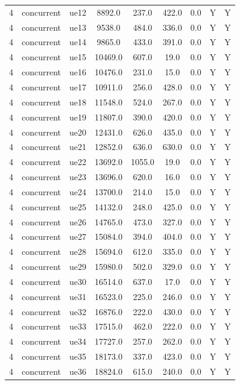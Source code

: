 \begin{table}[ht]
\begin{tabular}{|c|c|c|c|c|c|c|c|c|}
4 & concurrent & ue12 & 8892.0 & 237.0 & 422.0 & 0.0 & Y & Y \\
4 & concurrent & ue13 & 9538.0 & 484.0 & 336.0 & 0.0 & Y & Y \\
4 & concurrent & ue14 & 9865.0 & 433.0 & 391.0 & 0.0 & Y & Y \\
4 & concurrent & ue15 & 10469.0 & 607.0 & 19.0 & 0.0 & Y & Y \\
4 & concurrent & ue16 & 10476.0 & 231.0 & 15.0 & 0.0 & Y & Y \\
4 & concurrent & ue17 & 10911.0 & 256.0 & 428.0 & 0.0 & Y & Y \\
4 & concurrent & ue18 & 11548.0 & 524.0 & 267.0 & 0.0 & Y & Y \\
4 & concurrent & ue19 & 11807.0 & 390.0 & 420.0 & 0.0 & Y & Y \\
4 & concurrent & ue20 & 12431.0 & 626.0 & 435.0 & 0.0 & Y & Y \\
4 & concurrent & ue21 & 12852.0 & 636.0 & 630.0 & 0.0 & Y & Y \\
4 & concurrent & ue22 & 13692.0 & 1055.0 & 19.0 & 0.0 & Y & Y \\
4 & concurrent & ue23 & 13696.0 & 620.0 & 16.0 & 0.0 & Y & Y \\
4 & concurrent & ue24 & 13700.0 & 214.0 & 15.0 & 0.0 & Y & Y \\
4 & concurrent & ue25 & 14132.0 & 248.0 & 425.0 & 0.0 & Y & Y \\
4 & concurrent & ue26 & 14765.0 & 473.0 & 327.0 & 0.0 & Y & Y \\
4 & concurrent & ue27 & 15084.0 & 394.0 & 404.0 & 0.0 & Y & Y \\
4 & concurrent & ue28 & 15694.0 & 612.0 & 335.0 & 0.0 & Y & Y \\
4 & concurrent & ue29 & 15980.0 & 502.0 & 329.0 & 0.0 & Y & Y \\
4 & concurrent & ue30 & 16514.0 & 637.0 & 17.0 & 0.0 & Y & Y \\
4 & concurrent & ue31 & 16523.0 & 225.0 & 246.0 & 0.0 & Y & Y \\
4 & concurrent & ue32 & 16876.0 & 222.0 & 430.0 & 0.0 & Y & Y \\
4 & concurrent & ue33 & 17515.0 & 462.0 & 222.0 & 0.0 & Y & Y \\
4 & concurrent & ue34 & 17727.0 & 257.0 & 262.0 & 0.0 & Y & Y \\
4 & concurrent & ue35 & 18173.0 & 337.0 & 423.0 & 0.0 & Y & Y \\
4 & concurrent & ue36 & 18824.0 & 615.0 & 240.0 & 0.0 & Y & Y \\

\end{tabular}
\end{table}
